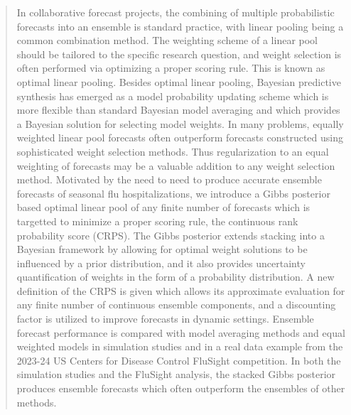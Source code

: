 \begin{abstract}
In collaborative forecast projects, the combining of multiple probabilistic 
forecasts into an ensemble is standard practice, with linear pooling
being a common combination method.
The weighting scheme of a linear pool should be 
tailored to the specific research question, and weight selection is often 
performed via optimizing a proper scoring rule. This is known as optimal
linear pooling.
Besides optimal linear pooling, Bayesian predictive synthesis has 
emerged as a model probability updating scheme which is more flexible than
standard Bayesian model averaging and which provides a Bayesian 
solution for selecting model weights.
In many problems, equally weighted linear pool forecasts often 
outperform forecasts constructed using sophisticated weight selection methods.
Thus regularization to an equal weighting of forecasts may be a valuable 
addition to any weight selection method.
Motivated by the need to need to produce accurate ensemble forecasts of 
seasonal flu hospitalizations, 
we introduce a Gibbs posterior based optimal linear pool
of any finite number of forecasts
which is targetted to minimize a proper scoring rule, the continuous rank
probability score (CRPS). 
The Gibbs posterior extends stacking 
into a Bayesian framework by allowing for optimal weight solutions to be 
influenced by a prior distribution, and it also provides uncertainty 
quantification of weights in the form of a probability distribution. 
A new definition of the CRPS is given which allows its approximate evaluation
for any finite number of continuous ensemble components, and a discounting 
factor is utilized to improve forecasts in dynamic settings.
Ensemble forecast performance is compared 
with model averaging methods and equal 
weighted models in simulation studies and in a real data example from the 
2023-24 US Centers for Disease Control FluSight competition. In both the 
simulation studies and the FluSight analysis, the stacked Gibbs posterior 
produces ensemble forecasts which often outperform the ensembles of other 
methods.
\end{abstract}
